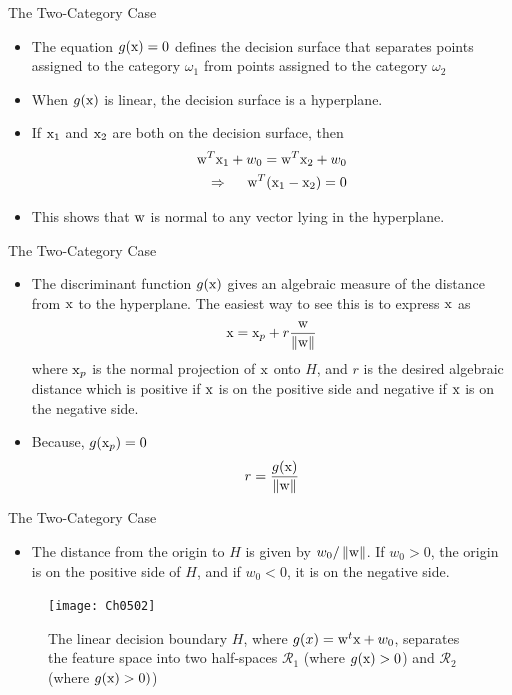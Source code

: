 \begin{frame}{The Two-Category Case}
\begin{itemize}
\item The equation $g({\rm x}) = 0$ defines the decision surface that separates points assigned to the category ${\omega_1}$ from points assigned to the category ${\omega}_2$
\item When $g({\rm x})$ is linear, the decision surface is a hyperplane.
\item If ${\rm x}_1$ and ${\rm x}_2$ are both on the decision
surface, then
\begin{align}
{\rm w}^T{\rm x}_1+w_0={\rm w}^T{\rm x}_2+w_0 \nonumber\\
\Rightarrow ~~~~{\rm w}^T({\rm x}_1-{\rm x}_2)=0\nonumber
\end{align}
\item This shows that ${\rm w}$ is normal to any vector lying in the hyperplane.
\end{itemize}
\end{frame}

\begin{frame}{The Two-Category Case}
\begin{itemize}
\item The discriminant function $g({\rm x})$ gives an algebraic measure of the distance from $\rm x$ to the hyperplane. The easiest way to see this is to express ${\rm x}$ as
\begin{equation}
{\rm x} = {{\rm x}_p} + r\frac{{\rm w}}{{\left\| {\rm w} \right\|}} \nonumber
\end{equation}
where ${\rm x}_p$ is the normal projection of ${\rm x}$ onto $H$, and $r$ is the desired algebraic distance which is positive if ${\rm x}$ is on the positive side and negative if ${\rm x}$ is on the negative side.
\item Because, $g({\rm x}_p)=0$
\begin{equation}
r = \frac{{g({\rm x})}}{{\left\| {\rm w} \right\|}} \nonumber
\end{equation}
\end{itemize}
\end{frame}

\begin{frame}{The Two-Category Case}
\begin{itemize}
\item The distance from the origin to $H$ is given by $w_0/\left\| {\rm w} \right\|$. If $w_0>0$, the origin is on the positive side of $H$, and if $w_0<0$, it is on the negative side.
\end{itemize}
\begin{figure}
\texttt{[image: Ch0502]}
\caption{The linear decision boundary $H$, where $g(x)={\rm w}^t{\rm x}+w_0$, separates the feature space into two half-spaces $\mathcal{R}_1$ (where $g({\rm  x})>0$) and $\mathcal{R}_2$ (where $g({\rm x})>0)$)}
\end{figure}
\end{frame}

